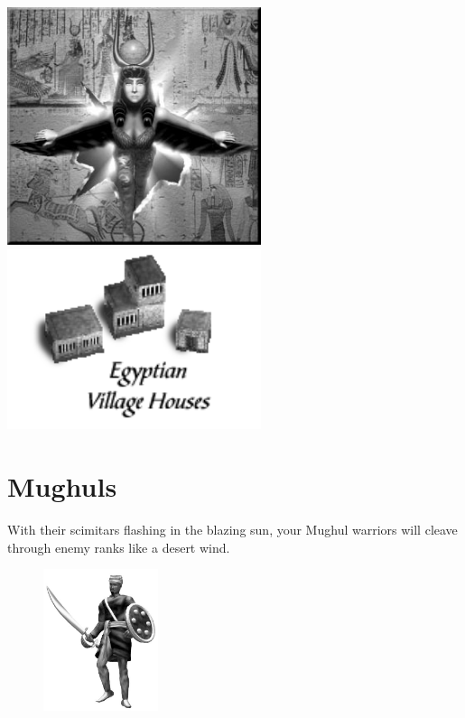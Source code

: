\begin{center}
	\includegraphics[width=74.25mm]{Aisis}\includegraphics[width=74.25mm]{Iegyptianhouse}
\end{center}

\clearpage

\section{Mughuls}

With their scimitars flashing in the blazing sun, your Mughul warriors will cleave through enemy ranks like a desert wind.

\begin{figure}
	\begin{center}
		\vspace{-20pt}
		\includegraphics[width=0.3\textwidth]{Amughal}
	\end{center}
	\vspace{-20pt}
\end{figure}

